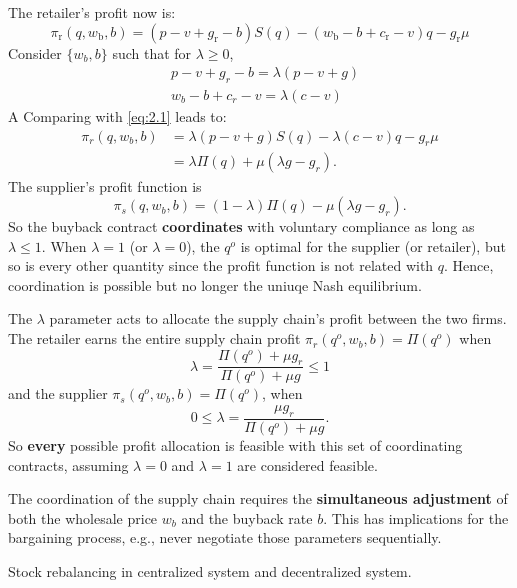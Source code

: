 The retailer's profit now is:
$$\pi_{\mathrm{r}}\left(q, w_{\mathrm{b}}, b\right)=\left(p-v+g_{\mathrm{r}}-b\right) S(q)-\left(w_{\mathrm{b}}-b+c_{\mathrm{r}}-v\right) q-g_{\mathrm{r}} \mu$$
Consider $\{w_b,b\}$ such that for $\lambda\geq 0$,
\begin{align}
    &p-v+g_r-b=\lambda(p-v+g)\\
    &w_b-b+c_r-v=\lambda(c-v)
\end{align}
A Comparing with \autoref{eq:2.1} leads to:
\begin{align}
    \pi_r(q,w_b,b)&=\lambda(p-v+g)S(q)-\lambda(c-v)q-g_r\mu\nonumber\\
    &=\lambda\Pi(q)+\mu(\lambda g-g_r).\label{eq:2.7}
\end{align}
The supplier's profit function is 
\begin{equation*}
    \pi_s(q,w_b,b)=(1-\lambda)\Pi(q)-\mu(\lambda g-g_r).
\end{equation*}
So the buyback contract \textbf{coordinates} with voluntary compliance as long as $\lambda\leq 1$. When $\lambda=1$ (or $\lambda=0$), the $q^o$ is optimal for the supplier (or retailer), but so is every other quantity since the profit function is not related with $q$. Hence, coordination is possible but no longer the uniuqe Nash equilibrium.

The $\lambda$ parameter acts to allocate the supply chain's profit between the two firms. The retailer earns the entire supply chain profit $\pi_r(q^o,w_b,b)=\Pi(q^o)$ when 
\begin{equation}\label{eq:2.8}
    \lambda=\frac{\Pi(q^o)+\mu g_r}{\Pi(q^o)+\mu g}\leq 1
\end{equation}
and the supplier $\pi_s(q^o,w_b,b)=\Pi(q^o)$, when
\begin{equation}\label{eq:2.9}
    0\leq \lambda=\frac{\mu g_r}{\Pi(q^o)+\mu g}.
\end{equation}
So \textbf{every} possible profit allocation is feasible with this set of coordinating contracts, assuming $\lambda=0$ and $\lambda=1$ are considered feasible.

\begin{note}
    The coordination of the supply chain requires the \textbf{simultaneous adjustment} of both the wholesale price $w_b$ and the buyback rate $b$. This has implications for the bargaining process, e.g., never negotiate those parameters sequentially.
\end{note}

\begin{note}
    Stock rebalancing in centralized system and decentralized system.
\end{note}

